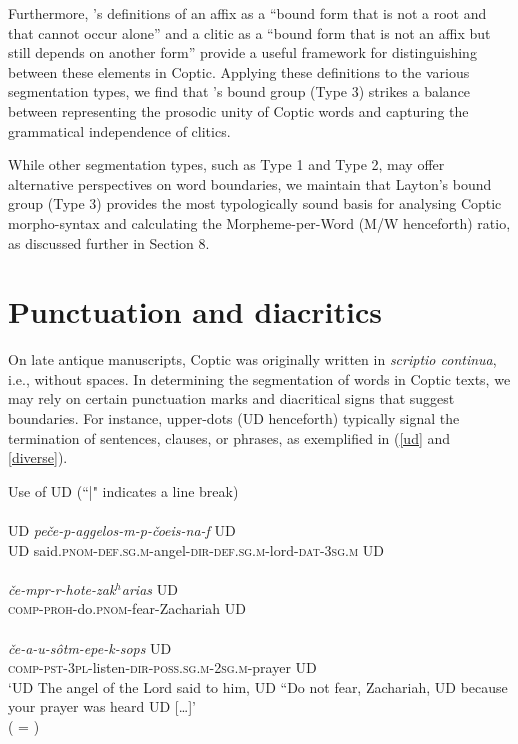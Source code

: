 \documentclass[output=paper,colorlinks,citecolor=brown ,chinesefont]{langscibook}
\begin{document}
Furthermore, \citet{haspelmath2023}'s definitions of an affix as a “bound form that is not a root and that cannot occur alone” and a clitic as a “bound form that is not an affix but still depends on another form” provide a useful framework for distinguishing between these elements in Coptic. Applying these definitions to the various segmentation types, we find that \citet{layton1}'s bound group (Type 3) strikes a balance between representing the prosodic unity of Coptic words and capturing the grammatical independence of clitics.

While other segmentation types, such as Type 1 and Type 2, may offer alternative perspectives on word boundaries, we maintain that Layton's bound group (Type 3) provides the most typologically sound basis for analysing Coptic morpho-syntax and calculating the Morpheme-per-Word (M/W henceforth) ratio, as discussed further in Section 8.



\section{Punctuation and diacritics}

On late antique manuscripts, Coptic was originally written in \textit{scriptio continua}, i.e., without spaces. In determining the segmentation of words in Coptic texts, we may rely on certain punctuation marks and diacritical signs that suggest boundaries. For instance, upper-dots (UD henceforth) typically signal the termination of sentences, clauses, or phrases, as exemplified in (\ref{ud} and \ref{diverse}).

\begin{exe}
\ex\label{ud} Use of UD (“|" indicates a line break) \\  
\glll {}    \\
UD \textit{peče-p-aggelos-m-p-čoeis-na-f} UD \\
UD said.\textsc{pnom}-\textsc{def}.\textsc{sg}.\textsc{m}-angel-\textsc{dir}-\textsc{def}.\textsc{sg}.\textsc{m}-lord-\textsc{dat}-3\textsc{sg}.\textsc{m}  UD \\

\glll {}  \\
\textit{če-mpr-r-hote-zak$^h$arias} UD  \\
\textsc{comp}-\textsc{proh}-do.\textsc{pnom}-fear-Zachariah UD  \\

\glll {}  \\
\textit{če-a-u-sôtm-epe-k-sops} UD \\
\textsc{comp}-\textsc{pst}-3\textsc{pl}-listen-\textsc{dir}-\textsc{poss}.\textsc{sg}.\textsc{m}-2\textsc{sg}.\textsc{m}-prayer UD \\

\glt  ‘UD The angel of the Lord said to him, UD “Do not fear, Zachariah, UD because your prayer was heard UD […]' \\
\hspace*{\fill}( = )
\end{exe}
\end{document}
